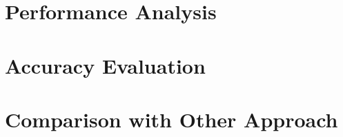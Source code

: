 \section{Performance Analysis}


\section{Accuracy Evaluation}


\section{Comparison with Other Approach}